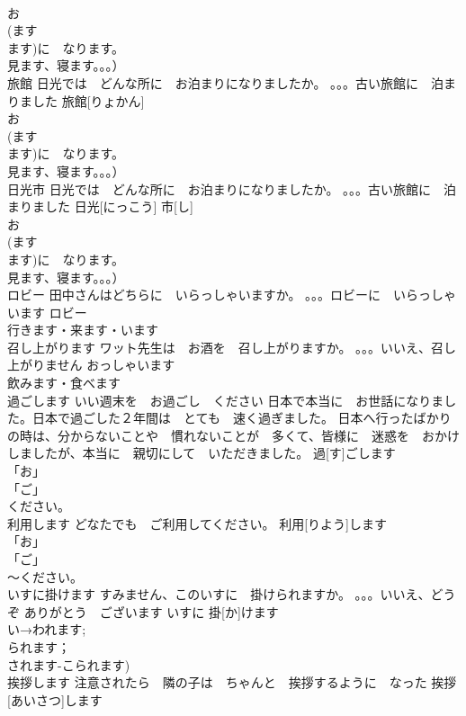 \documentclass[8pt]{extreport}
\begin{document}
\begin{CJK}{UTF8}{min}
\\	お
\\	(ます
\\	ます)に　なります。
\\	見ます、寝ます。。。）	
\\	旅館	日光では　どんな所に　お泊まりになりましたか。 。。。古い旅館に　泊まりました	旅館[りょかん]			
\\	お
\\	(ます
\\	ます)に　なります。
\\	見ます、寝ます。。。）	
\\	日光市	日光では　どんな所に　お泊まりになりましたか。 。。。古い旅館に　泊まりました	日光[にっこう] 市[し]			
\\	お
\\	(ます
\\	ます)に　なります。
\\	見ます、寝ます。。。）	
\\	ロビー	田中さんはどちらに　いらっしゃいますか。 。。。ロビーに　いらっしゃいます	ロビー			
\\	行きます・来ます・います
\\	召し上がります	ワット先生は　お酒を　召し上がりますか。 。。。いいえ、召し上がりません	おっしゃいます				
\\	飲みます・食べます
\\	過ごします	いい週末を　お過ごし　ください 日本で本当に　お世話になりました。日本で過ごした２年間は　とても　速く過ぎました。 日本へ行ったばかりの時は、分からないことや　慣れないことが　多くて、皆様に　迷惑を　おかけしましたが、本当に　親切にして　いただきました。	過[す]ごします			
\\	「お」
\\	「ご」
\\	ください。	
\\	利用します	どなたでも　ご利用してください。	利用[りよう]します			
\\	「お」
\\	「ご」
\\	～ください。	
\\	いすに掛けます	すみません、このいすに　掛けられますか。 。。。いいえ、どうぞ ありがとう　ございます	いすに 掛[か]けます			
\\	い→われます;
\\	られます；
\\	されます-こられます)
\\	挨拶します	注意されたら　隣の子は　ちゃんと　挨拶するように　なった	挨拶[あいさつ]します			

\end{CJK}
\end{document}
